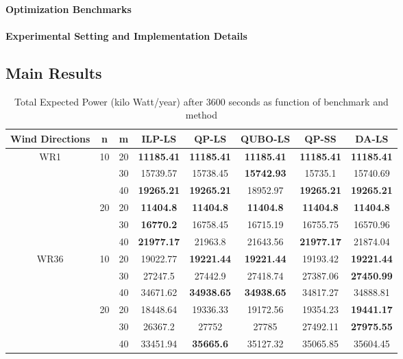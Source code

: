\documentclass[preprint,12pt]{elsarticle}
\begin{document}
\paragraph{Optimization Benchmarks}

\paragraph{Experimental Setting and Implementation Details}

\subsection{Main Results}

\begin{table}[ht]

	\begin{tabular}{| c | c | c | c | c | c | c | c |}
		\toprule
		Wind Directions  & n        & m        & ILP-LS       & QP-LS       & QUBO-LS       & QP-SS       & DA-LS     \\
		\toprule
		\multirow{6}{*}{WR1}  & \multirow{3}{*}{10}       & 20       & \textbf{11185.41} & \textbf{11185.41} & \textbf{11185.41} & \textbf{11185.41} & \textbf{11185.41} \\
			& & 30   & 15739.57 & 15738.45 & \textbf{15742.93} & 15735.1  & 15740.69         \\
		& & 40 & \textbf{19265.21} & \textbf{19265.21} & 18952.97 & \textbf{19265.21} & \textbf{19265.21}                \\
				\cline{2-8}
		&\multirow{3}{*}{20}   & 20       & \textbf{11404.8}  & \textbf{11404.8}  & \textbf{11404.8}  & \textbf{11404.8}  & \textbf{11404.8}           \\
		&&30   & \textbf{16770.2} & 16758.45 & 16715.19 & 16755.75 & 16570.96                   \\
		&&40   & \textbf{21977.17} & 21963.8 & 21643.56 & \textbf{21977.17} & 21874.04                     \\
		\hline
		\multirow{6}{*}{WR36} &  \multirow{3}{*}{10}    & 20       & 19022.77 & \textbf{19221.44} & \textbf{19221.44} & 19193.42 & \textbf{19221.44} \\
		&& 30   & 27247.5  & 27442.9  & 27418.74 & 27387.06 & \textbf{27450.99}                  \\
		&&40   & 34671.62 & \textbf{34938.65} & \textbf{34938.65} & 34817.27 & 34888.81                  \\
		\cline{2-8}
		&  \multirow{3}{*}{20}   & 20       & 18448.64 & 19336.33 & 19172.56 & 19354.23 & \textbf{19441.17}          \\
		&&30   & 26367.2  & 27752 & 27785 & 27492.11 & \textbf{27975.55}                     \\
		&&40   & 33451.94 & \textbf{35665.6}  & 35127.32 & 35065.85 & 35604.45  \\
		\bottomrule                   
	\end{tabular}

\vspace{0.5em}
\caption{Total Expected Power (kilo Watt/year) after 3600 seconds as function of benchmark and method}\label{tab:results1}
\end{table}
\end{document}
